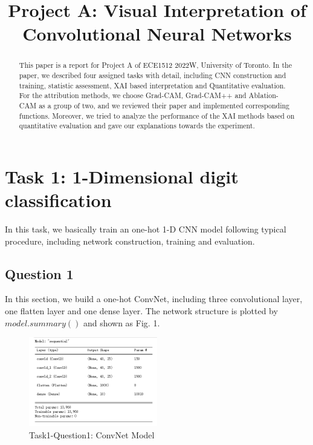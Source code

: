 \documentclass[conference]{IEEEtran}
\begin{document}
\title{Project A: Visual Interpretation of Convolutional Neural Networks}
	\maketitle
	
	\begin{abstract}
		This paper is a report for Project A of ECE1512 2022W, University of Toronto. In the paper, we described four assigned tasks with detail, including CNN construction and training, statistic assessment, XAI based interpretation and Quantitative evaluation. For the attribution methods, we choose Grad-CAM, Grad-CAM++ and Ablation-CAM as a group of two, and we reviewed their paper and implemented corresponding functions. Moreover, we tried to analyze the performance of the XAI methods based on quantitative evaluation and gave our explanations towards the experiment.
	\end{abstract}
	
	\section{Task 1: 1-Dimensional digit classification}
	
	In this task, we basically train an one-hot 1-D CNN model following typical procedure, including network construction, training and evaluation.
	
	\subsection{Question 1}
	
	In this section, we build a one-hot ConvNet, including three convolutional layer, one flatten layer and one dense layer.
	The network structure is plotted by $model.summary()$ and shown as Fig. 1.
	
	\begin{figure}[h] 
		\centering
		\includegraphics[width=0.5\textwidth]{T1Q1.png}
		\caption{Task1-Question1: ConvNet Model}
		\label{Fig.t1q1}
	\end{figure}
	
\end{document}
